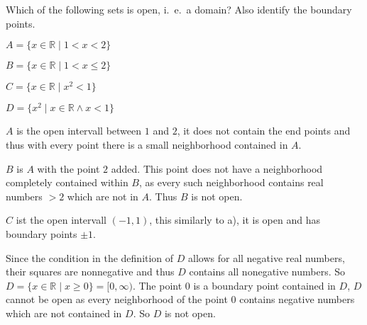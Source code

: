Which of the following sets is open, i.~e.~a domain?
Also identify the boundary points.
\begin{teilaufgaben}
\item $A = \{x\in \mathbb{R} \mid 1<x<2\}$
\item $B = \{x\in \mathbb{R} \mid 1<x\le 2\}$
\item $C = \{x\in \mathbb{R} \mid x^2 < 1\}$
\item $D = \{x^2\mid x \in \mathbb{R} \wedge x < 1\}$
\end{teilaufgaben}

\begin{loesung}
\begin{teilaufgaben}
\item
$A$ is the open intervall between $1$ and $2$, it does not contain
the end points and thus with every point there is a small neighborhood
contained in $A$.
\item
$B$ is $A$ with the point $2$ added.
This point does not have a neighborhood completely contained within $B$,
as every such neighborhood contains real numbers $>2$ which are not in $A$.
Thus $B$ is not open.
\item
$C$ ist the open intervall $(-1,1)$, this similarly to a), it is open
and has boundary points $\pm 1$.
\item
Since the condition in the definition of $D$ allows for all negative
real numbers, their squares are nonnegative and thus
$D$ contains all nonegative numbers.
So $D=\{x\in \mathbb{R}\mid x\ge 0\}=[0,\infty)$.
The point $0$ is a boundary point contained in $D$, $D$ cannot be open
as every neighborhood of the point $0$ contains negative numbers
which are not contained in $D$.
So $D$ is not open.
\qedhere
\end{teilaufgaben}
\end{loesung}


